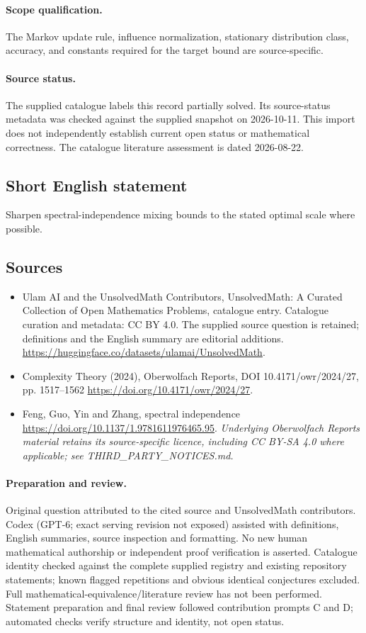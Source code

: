 \documentclass[11pt]{article}
\begin{document}
\paragraph{Scope qualification.}
The Markov update rule, influence normalization, stationary distribution class, accuracy, and constants required for the target bound are source-specific.
\paragraph{Source status.}
The supplied catalogue labels this record partially solved. Its source-status metadata was checked against the supplied snapshot on 2026-10-11. This import does not independently establish current open status or mathematical correctness. The catalogue literature assessment is dated 2026-08-22.
\subsection{Short English statement}
Sharpen spectral-independence mixing bounds to the stated optimal scale where possible.
\subsection{Sources}
\begin{itemize}
\item[S1] Ulam AI and the UnsolvedMath Contributors, UnsolvedMath: A Curated Collection of Open Mathematics Problems, catalogue entry. Catalogue curation and metadata: CC BY 4.0. The supplied source question is retained; definitions and the English summary are editorial additions.
\url{https://huggingface.co/datasets/ulamai/UnsolvedMath}.
\item[S2] Complexity Theory (2024), Oberwolfach Reports, DOI 10.4171/owr/2024/27, pp. 1517--1562
\url{https://doi.org/10.4171/owr/2024/27}.
\item[S3] Feng, Guo, Yin and Zhang, spectral independence
\url{https://doi.org/10.1137/1.9781611976465.95}.
\textit{Underlying Oberwolfach Reports material retains its source-specific licence, including CC BY-SA 4.0 where applicable; see THIRD\_PARTY\_NOTICES.md.}
\end{itemize}
\paragraph{Preparation and review.}
Original question attributed to the cited source and UnsolvedMath contributors. Codex (GPT-6; exact serving revision not exposed) assisted with definitions, English summaries, source inspection and formatting. No new human mathematical authorship or independent proof verification is asserted. Catalogue identity checked against the complete supplied registry and existing repository statements; known flagged repetitions and obvious identical conjectures excluded. Full mathematical-equivalence/literature review has not been performed. Statement preparation and final review followed contribution prompts C and D; automated checks verify structure and identity, not open status.
\label{end:statement}
\end{document}
